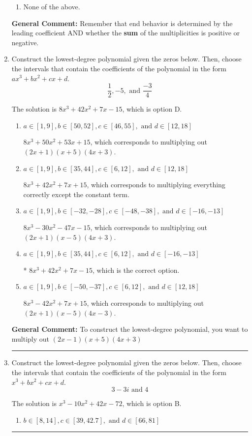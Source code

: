 \documentclass{extbook}[14pt]
\newcommand{\litem}[1]{\item #1

\rule{\textwidth}{0.4pt}}
\begin{document}
\begin{enumerate}
{\begin{enumerate}[label=\Alph*.]
\begin{multicols}{2}
\end{multicols}\item None of the above.\end{enumerate}
\textbf{General Comment:} Remember that end behavior is determined by the leading coefficient AND whether the \textbf{sum} of the multiplicities is positive or negative.
}
\litem{
Construct the lowest-degree polynomial given the zeros below. Then, choose the intervals that contain the coefficients of the polynomial in the form $ax^3+bx^2+cx+d$.
\[ \frac{1}{2}, -5, \text{ and } \frac{-3}{4} \]

The solution is \( 8x^{3} +42 x^{2} +7 x -15 \), which is option D.\begin{enumerate}[label=\Alph*.]
\item \( a \in [1, 9], b \in [50, 52], c \in [46, 55], \text{ and } d \in [12, 18] \)

$8x^{3} +50 x^{2} +53 x + 15$, which corresponds to multiplying out $(2x + 1)(x + 5)(4x + 3)$.
\item \( a \in [1, 9], b \in [35, 44], c \in [6, 12], \text{ and } d \in [12, 18] \)

$8x^{3} +42 x^{2} +7 x + 15$, which corresponds to multiplying everything correctly except the constant term.
\item \( a \in [1, 9], b \in [-32, -28], c \in [-48, -38], \text{ and } d \in [-16, -13] \)

$8x^{3} -30 x^{2} -47 x -15$, which corresponds to multiplying out $(2x + 1)(x -5)(4x + 3)$.
\item \( a \in [1, 9], b \in [35, 44], c \in [6, 12], \text{ and } d \in [-16, -13] \)

* $8x^{3} +42 x^{2} +7 x -15$, which is the correct option.
\item \( a \in [1, 9], b \in [-50, -37], c \in [6, 12], \text{ and } d \in [12, 18] \)

$8x^{3} -42 x^{2} +7 x + 15$, which corresponds to multiplying out $(2x + 1)(x -5)(4x -3)$.
\end{enumerate}

\textbf{General Comment:} To construct the lowest-degree polynomial, you want to multiply out $(2x -1)(x + 5)(4x + 3)$
}
\litem{
Construct the lowest-degree polynomial given the zeros below. Then, choose the intervals that contain the coefficients of the polynomial in the form $x^3+bx^2+cx+d$.
\[ 3 - 3 i \text{ and } 4 \]

The solution is \( x^{3} -10 x^{2} +42 x -72 \), which is option B.\begin{enumerate}[label=\Alph*.]
\item \( b \in [8, 14], c \in [39, 42.7], \text{ and } d \in [66, 81] \)


\end{enumerate}}
\end{enumerate}
\end{document}
